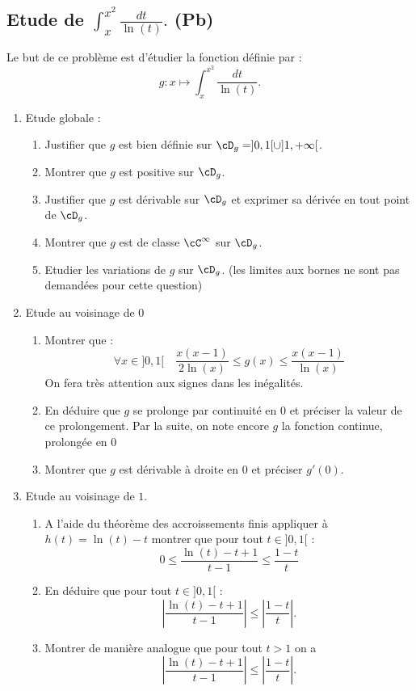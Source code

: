 \subsection{Etude de $\int_x^{x^2} \frac{dt}{\ln(t)}.$ (Pb) }

\begin{exercice}
Le but de ce problème est d'étudier la fonction définie par : 
$$g : x \mapsto \int_x^{x^2} \frac{dt}{\ln(t)}.$$
\begin{enumerate}
\item Etude globale : 
\begin{enumerate}
\item Justifier que $g$ est bien définie sur $\cD_g = ]0,1[\cup ]1,+\infty[$. 
\item Montrer que $g$ est positive sur $\cD_g$. 
\item Justifier que $g$ est dérivable sur $\cD_g$  et exprimer sa dérivée en tout point de $\cD_g$. 
\item Montrer que $g$ est de classe $\cC^\infty$ sur $\cD_g$. 
\item Etudier les variations de $g$ sur $\cD_g$. (les limites aux bornes ne sont pas demandées pour cette question) 
\end{enumerate}
\item Etude au voisinage de $0$
\begin{enumerate}
\item Montrer que :
$$\forall x\in ]0,1[\quad \frac{x(x-1)}{2\ln(x)}\leq g(x)\leq \frac{x(x-1)}{\ln(x)}$$
On fera très attention aux signes dans les inégalités. 
\item En déduire que $g$ se prolonge par continuité en $0$ et préciser la valeur de ce prolongement. 
Par la suite, on note encore $g$ la fonction continue, prolongée en $0$
\item Montrer que $g$ est dérivable à droite en $0$ et préciser $g'(0)$. 
\end{enumerate}
\item Etude au voisinage de $1$.
\begin{enumerate}
\item A l'aide du théorème des accroissements finis appliquer à $h(t) =\ln(t) -t$ montrer que pour tout $t\in ]0,1[ $ :
$$0\leq \frac{\ln(t) - t+ 1 }{t-1}\leq \frac{1-t}{t} $$
\item En déduire que pour tout $t\in ]0,1[ $ :
$$\left|\frac{\ln(t) - t+ 1 }{t-1}\right|\leq \left|\frac{1-t}{t}\right|.$$
\item Montrer de manière analogue que pour tout $t>1$ on  a
$$\left|\frac{\ln(t) - t+ 1 }{t-1}\right|\leq \left|\frac{1-t}{t}\right|.$$


\end{enumerate}
\end{enumerate}
\end{exercice}
